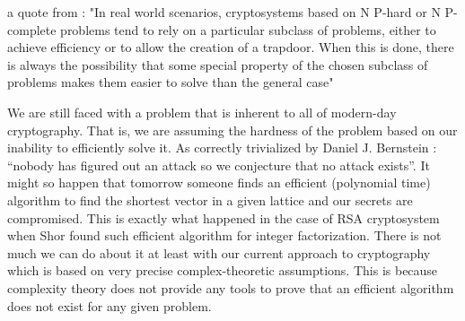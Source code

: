 a quote from \cite{intro_cryp}: "In real world scenarios, cryptosystems based on N P-hard or N P-complete problems tend to rely on a particular subclass of problems, either to achieve efficiency or to allow the creation of a trapdoor. When this is done, there is always the possibility that some special property of the chosen subclass of problems makes them easier to solve than the general case"
\begin{remark}
    We are still faced with a problem that is inherent to all of modern-day cryptography. That is, we are assuming the hardness of the problem based on our inability to efficiently solve it. As correctly trivialized by Daniel J. Bernstein \cite{bernstein}: ``nobody has figured out an attack so we conjecture that no attack exists''. It might so happen that tomorrow someone finds an efficient (polynomial time) algorithm to find the shortest vector in a given lattice and our secrets are compromised. This is exactly what happened in the case of RSA cryptosystem when Shor found such efficient algorithm for integer factorization. There is not much we can do about it at least with our current approach to cryptography which is based on very precise complex-theoretic assumptions. This is because complexity theory does not provide any tools to prove that an efficient algorithm does not exist for any given problem.
\end{remark}
